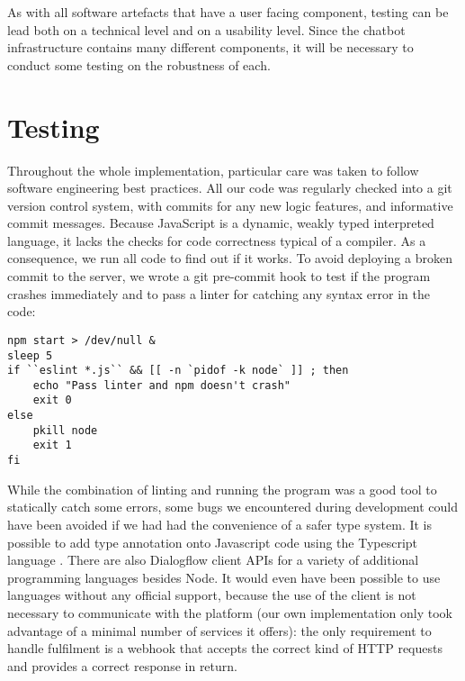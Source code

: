 As with all software artefacts that have a user facing component, testing can be lead both on a technical level and on a usability level. Since the chatbot infrastructure contains many different components, it will be necessary to conduct some testing on the robustness of each.
\section{Testing}
Throughout the whole implementation, particular care was taken to follow software engineering best practices. All our code was regularly checked into a git version control system, with commits for any new logic features, and informative commit messages. Because JavaScript is a dynamic, weakly typed interpreted language, it lacks the checks for code correctness typical of a compiler. As a consequence, we run all code to find out if it works. To avoid deploying a broken commit to the server, we wrote a git pre-commit hook to test if the program crashes immediately and to pass a linter for catching any syntax error in the code:
\begin{lstlisting}
npm start > /dev/null &
sleep 5
if ``eslint *.js`` && [[ -n `pidof -k node` ]] ; then
    echo "Pass linter and npm doesn't crash"
    exit 0
else
    pkill node
    exit 1
fi
\end{lstlisting}
While the combination of linting and running the program was a good tool to statically catch some errors, some bugs we encountered during development could have been avoided if we had had the convenience of a safer type system. It is possible to add type annotation onto Javascript code using the Typescript language \cite{typescript}. There are also Dialogflow client APIs for a variety of additional programming languages besides Node. It would even have been possible to use languages without any official support, because the use of the client is not necessary to communicate with the platform (our own implementation only took advantage of a minimal number of services it offers): the only requirement to handle fulfilment is a webhook that accepts the correct kind of HTTP requests and provides a correct response in return. 

